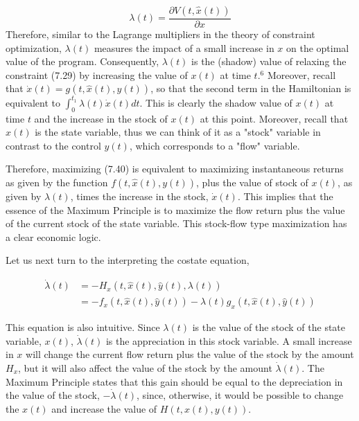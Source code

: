 \documentclass[\topdir/lecture_notes.tex]{subfiles}
\begin{document}
\[
\lambda(t)=\frac{\partial V(t, \hat{x}(t))}{\partial x}
\]
Therefore, similar to the Lagrange multipliers in the theory of constraint optimization, $\lambda(t)$ measures the impact of a small increase in $x$ on the optimal value of the program. Consequently, $\lambda(t)$ is the (shadow) value of relaxing the constraint (7.29) by increasing the value of $x(t)$ at time $t .{ }^{6}$ Moreover, recall that $\dot{x}(t)=g(t, \hat{x}(t), y(t))$, so that the second term in the Hamiltonian is equivalent to $\int_{0}^{t_{1}} \lambda(t) \dot{x}(t) d t$. This is clearly the shadow value of $x(t)$ at time $t$ and the increase in the stock of $x(t)$ at this point. Moreover, recall that $x(t)$ is the state variable, thus we can think of it as a "stock" variable in contrast to the control $y(t)$, which corresponds to a "flow" variable.

Therefore, maximizing (7.40) is equivalent to maximizing instantaneous returns as given by the function $f(t, \hat{x}(t), y(t))$, plus the value of stock of $x(t)$, as given by $\lambda(t)$, times the increase in the stock, $\dot{x}(t)$. This implies that the essence of the Maximum Principle is to maximize the flow return plus the value of the current stock of the state variable. This stock-flow type maximization has a clear economic logic.

Let us next turn to the interpreting the costate equation,

\[
\begin{aligned}
\dot{\lambda}(t) & =-H_{x}(t, \hat{x}(t), \hat{y}(t), \lambda(t)) \\
& =-f_{x}(t, \hat{x}(t), \hat{y}(t))-\lambda(t) g_{x}(t, \hat{x}(t), \hat{y}(t))
\end{aligned}
\]

This equation is also intuitive. Since $\lambda(t)$ is the value of the stock of the state variable, $x(t)$, $\dot{\lambda}(t)$ is the appreciation in this stock variable. A small increase in $x$ will change the current flow return plus the value of the stock by the amount $H_{x}$, but it will also affect the value of the stock by the amount $\dot{\lambda}(t)$. The Maximum Principle states that this gain should be equal to the depreciation in the value of the stock, $-\dot{\lambda}(t)$, since, otherwise, it would be possible to change the $x(t)$ and increase the value of $H(t, x(t), y(t))$.
\end{document}
